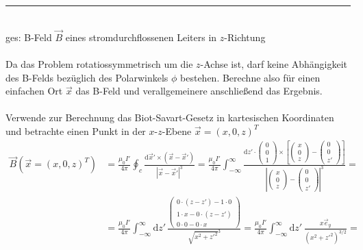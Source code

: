 \documentclass{article}
\newcommand{\diff}{\mathrm{d}}
\newcommand{\lr}[1]{\left(#1\right)}
\newcommand{\lreck}[1]{\left[#1\right]}
\begin{document}
{\color{violet}
\hrule
	\\
	ges: B-Feld $\vec{B}$ eines stromdurchflossenen Leiters in $z$-Richtung\\
	\\
	Da das Problem rotatiossymmetrisch um die $z$-Achse ist, darf keine Abhängigkeit des B-Felds bezüglich des Polarwinkels $\phi$ bestehen. Berechne also für einen einfachen Ort $\vec{x}$ das B-Feld und verallgemeinere anschließend das Ergebnis.\\
	\\
	Verwende zur Berechnung das Biot-Savart-Gesetz in kartesischen Koordinaten und betrachte einen Punkt in der $x$-$z$-Ebene $\vec{x} = (x,0,z)^T$
		\begin{align*}
			\vec{B}(\vec{x} = (x,0,z)^T ) &= \frac{\mu_0 I'}{4\pi}\oint_c \frac{\diff\vec{x}' \times (\vec{x} - \vec{x}')}{|\vec{x} - \vec{x}'|^3} = \frac{\mu_0 I'}{4\pi}\int_{-\infty}^{\infty} \frac{\diff z'\cdot
			\begin{pmatrix}
				0\\0\\1
			\end{pmatrix}
			\times
			\lreck{
			\begin{pmatrix}
				x\\0\\z
			\end{pmatrix}
			-
			\begin{pmatrix}
				0\\0\\z'
			\end{pmatrix}
			}
			}
			{\left|
			\begin{pmatrix}
				x\\0\\z
			\end{pmatrix}
			-
			\begin{pmatrix}
				0\\0\\z'
			\end{pmatrix}
			\right|^3} = \\
			&= \frac{\mu_0 I'}{4\pi} \int_{-\infty}^\infty \diff z'\, \frac{
			\begin{pmatrix}
				0\cdot (z-z') - 1\cdot 0\\
				1\cdot x - 0 \cdot  (z-z')\\
				0\cdot 0 - 0 \cdot x
			\end{pmatrix}
			}{\sqrt{x^2 + z'^2}^3} = \frac{\mu_0 I'}{4\pi} \int_{-\infty}^\infty \diff z'\, \frac{x \vec{e}_y}{\lr{x^2 + z'^2}^{3/2}} =

\end{align*}}
\end{document}
